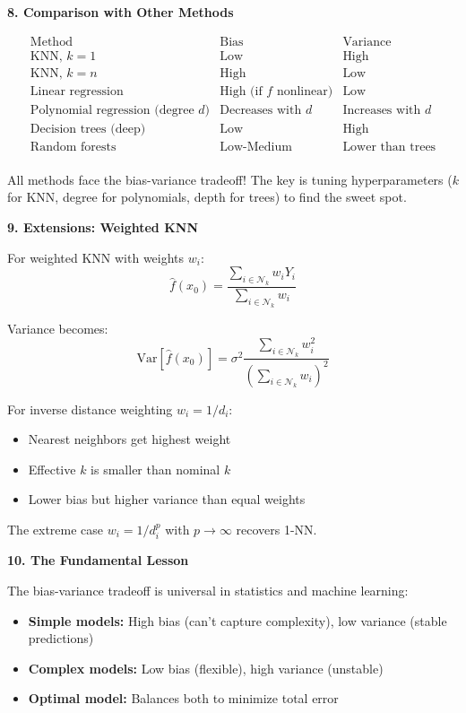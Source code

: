\documentclass[12pt]{article}
\begin{document}
\begin{explanation}
\textbf{8. Comparison with Other Methods}

\[
\begin{array}{l|c|c}
\text{Method} & \text{Bias} & \text{Variance} \\
\hline
\text{KNN, } k=1 & \text{Low} & \text{High} \\
\text{KNN, } k=n & \text{High} & \text{Low} \\
\text{Linear regression} & \text{High (if } f \text{ nonlinear)} & \text{Low} \\
\text{Polynomial regression (degree } d\text{)} & \text{Decreases with } d & \text{Increases with } d \\
\text{Decision trees (deep)} & \text{Low} & \text{High} \\
\text{Random forests} & \text{Low-Medium} & \text{Lower than trees} \\
\end{array}
\]

All methods face the bias-variance tradeoff! The key is tuning hyperparameters (\(k\) for KNN, degree for polynomials, depth for trees) to find the sweet spot.

\textbf{9. Extensions: Weighted KNN}

For weighted KNN with weights \(w_i\):
\[
\hat{f}(x_0) = \frac{\sum_{i \in \mathcal{N}_k} w_i Y_i}{\sum_{i \in \mathcal{N}_k} w_i}
\]

Variance becomes:
\[
\text{Var}[\hat{f}(x_0)] = \sigma^2 \frac{\sum_{i \in \mathcal{N}_k} w_i^2}{(\sum_{i \in \mathcal{N}_k} w_i)^2}
\]

For inverse distance weighting \(w_i = 1/d_i\):
\begin{itemize}
    \item Nearest neighbors get highest weight
    \item Effective \(k\) is smaller than nominal \(k\)
    \item Lower bias but higher variance than equal weights
\end{itemize}

The extreme case \(w_i = 1/d_i^p\) with \(p \to \infty\) recovers 1-NN.

\textbf{10. The Fundamental Lesson}

The bias-variance tradeoff is universal in statistics and machine learning:

\begin{itemize}
    \item \textbf{Simple models:} High bias (can't capture complexity), low variance (stable predictions)
    \item \textbf{Complex models:} Low bias (flexible), high variance (unstable)
    \item \textbf{Optimal model:} Balances both to minimize total error
\end{itemize}


\end{explanation}
\end{document}

